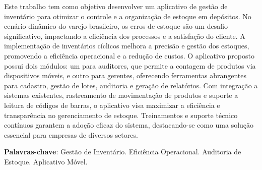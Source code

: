 Este trabalho tem como objetivo desenvolver um aplicativo de gestão de inventário para otimizar o controle e a organização de estoque em depósitos. No cenário dinâmico do varejo brasileiro, os erros de estoque são um desafio significativo, impactando a eficiência dos processos e a satisfação do cliente. A implementação de inventários cíclicos melhora a precisão e gestão dos estoques, promovendo a eficiência operacional e a redução de custos. O aplicativo proposto possui dois módulos: um para auditores, que permite a contagem de produtos via dispositivos móveis, e outro para gerentes, oferecendo ferramentas abrangentes para cadastro, gestão de lotes, auditoria e geração de relatórios. Com integração a sistemas existentes, rastreamento de movimentação de produtos e suporte a leitura de códigos de barras, o aplicativo visa maximizar a eficiência e transparência no gerenciamento de estoque. Treinamentos e suporte técnico contínuos garantem a adoção eficaz do sistema, destacando-se como uma solução essencial para empresas de diversos setores.

\textbf{Palavras-chave}: Gestão de Inventário. Eficiência Operacional. Auditoria de Estoque. Aplicativo Móvel.